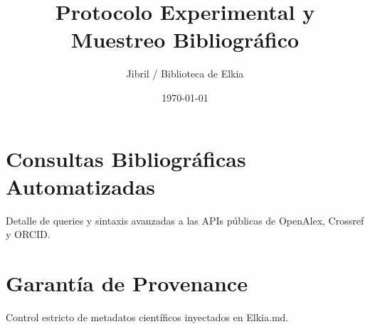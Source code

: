 \documentclass{article}
\title{Protocolo Experimental y Muestreo Bibliográfico}
\author{Jibril / Biblioteca de Elkia}
\date{\today}
\begin{document}
\maketitle

\section{Consultas Bibliográficas Automatizadas}
Detalle de queries y sintaxis avanzadas a las APIs públicas de OpenAlex, Crossref y ORCID.

\section{Garantía de Provenance}
Control estricto de metadatos científicos inyectados en Elkia.md.
\end{document}
